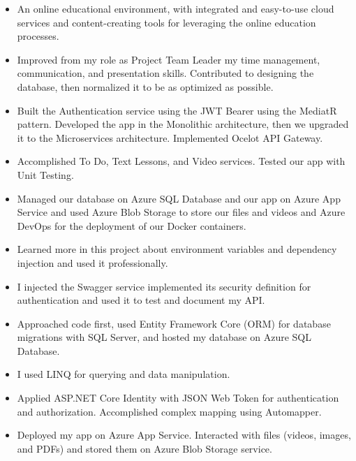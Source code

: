 \documentclass[10pt,a4paper,ragged2e,withhyper]{altacv}
\begin{document}
\begin{paracol}{2}
\divider

\begin{itemize}
\item An online educational environment, with integrated and easy-to-use cloud services and content-creating tools for leveraging the online education processes.
\item Improved from my role as Project Team Leader my time management, communication, and presentation skills. Contributed to designing the database, then normalized it to be as optimized as possible.
\item Built the Authentication service using the JWT Bearer using the MediatR pattern. Developed the app in the Monolithic architecture, then we upgraded it to the Microservices architecture. Implemented Ocelot API Gateway.
\item Accomplished To Do, Text Lessons, and Video services. Tested our app with Unit Testing.
\item Managed our database on Azure SQL Database and our app on Azure App Service and used Azure Blob Storage to store our files and videos and Azure DevOps for the deployment of our Docker containers.
\end{itemize}

\divider

\begin{itemize}
\item Learned more in this project about environment variables and dependency injection and used it professionally.
\item I injected the Swagger service implemented its security definition for authentication and used it to test and document my API.
\item Approached code first, used Entity Framework Core (ORM) for database migrations with SQL Server, and hosted my database on Azure SQL Database.
\item I used LINQ for querying and data manipulation.
\item Applied ASP.NET Core Identity with JSON Web Token for authentication and authorization. Accomplished complex mapping using Automapper.
\item Deployed my app on Azure App Service. Interacted with files (videos, images, and PDFs) and stored them on Azure Blob Storage service.
\end{itemize}


\end{paracol}
\end{document}
